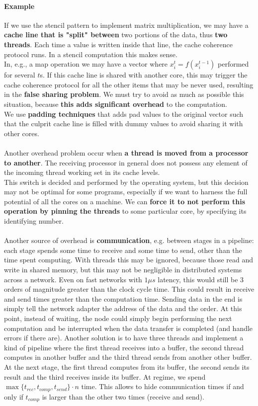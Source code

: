 \documentclass[10pt]{report}
\begin{document}
\paragraph{Example} If we use the stencil pattern to implement matrix multiplication, we may have a \textbf{cache line that is "split" between} two portions of the data, thus \textbf{two threads}. Each time a value is written inside that line, the cache coherence protocol runs. In a stencil computation this makes sense.\\
In, e.g., a map operation we may have a vector where $x_i^t = f(x_i^{t-1})$ performed for several $t$s. If this cache line is shared with another core, this may trigger the cache coherence protocol for all the other items that may be never used, resulting in the \textbf{false sharing problem}. We must try to avoid as much as possible this situation, because \textbf{this adds significant overhead} to the computation.\\
We use \textbf{padding techniques} that adds pad values to the original vector such that the culprit cache line is filled with dummy values to avoid sharing it with other cores.\\\\
Another overhead problem occur when \textbf{a thread is moved from a processor to another}. The receiving processor in general does not possess any element of the incoming thread working set in its cache levels.\\
This switch is decided and performed by the operating system, but this decision may not be optimal for some programs, especially if we want to harness the full potential of all the cores on a machine. We can \textbf{force it to not perform this operation by pinning the threads} to some particular core, by specifying its identifying number.\\\\
Another source of overhead is \textbf{communication}, e.g. between stages in a pipeline: each stage spends some time to receive and some time to send, other than the time spent computing. With threads this may be ignored, because those read and write in shared memory, but this may not be negligible in distributed systems across a network. Even on fast networks with $1\mu s$ latency, this would still be 3 orders of magnitude greater than the clock cycle time. This could result in receive and send times greater than the computation time. Sending data in the end is simply tell the network adapter the address of the data and the order. At this point, instead of waiting, the node could simply begin performing the next computation and be interrupted when the data transfer is completed (and handle errors if there are). Another solution is to have three threads and implement a kind of pipeline where the first thread receives into a buffer, the second thread computes in another buffer and the third thread sends from another other buffer. At the next stage, the first thread computes from its buffer, the second sends its result and the third receives inside its buffer. At regime, we spend $\max\{t_{rec}, t_{comp}, t_{send}\}\cdot n$ time. This allows to hide communication times if and only if $t_{comp}$ is larger than the other two times (receive and send).\\\\
\end{document}
